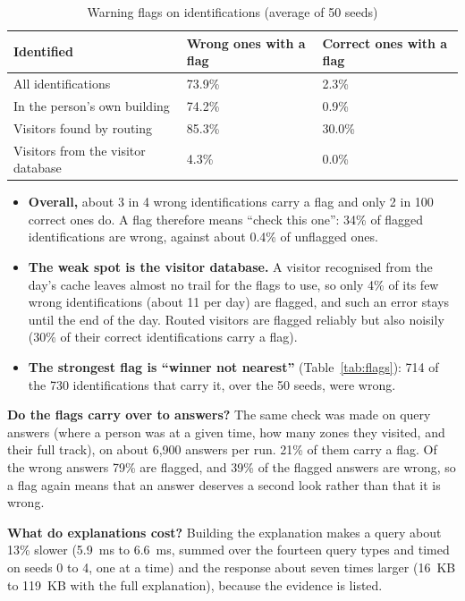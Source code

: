 \documentclass[12pt,a4paper,oneside]{report}
\begin{document}
\begin{table}[htbp]
\centering
\caption{Warning flags on identifications (average of 50 seeds)}\label{tab:expl-id}
{\small\setlength{\tabcolsep}{4pt}\renewcommand{\arraystretch}{1.2}
\begin{tabular}{|p{5.2cm}|p{4.6cm}|p{4.6cm}|}\hline
\textbf{Identified} & \textbf{Wrong ones with a flag} & \textbf{Correct ones with a flag}\\\hline
All identifications & 73.9\% & 2.3\%\\\hline
In the person's own building & 74.2\% & 0.9\%\\\hline
Visitors found by routing & 85.3\% & 30.0\%\\\hline
Visitors from the visitor database & 4.3\% & 0.0\%\\\hline
\end{tabular}}
\end{table}

\begin{itemize}
\item \textbf{Overall,} about 3 in 4 wrong identifications carry a flag and only 2 in 100 correct ones do. A flag therefore means ``check this one'': 34\% of flagged identifications are wrong, against about 0.4\% of unflagged ones.
\item \textbf{The weak spot is the visitor database.} A visitor recognised from the day's cache leaves almost no trail for the flags to use, so only 4\% of its few wrong identifications (about 11 per day) are flagged, and such an error stays until the end of the day. Routed visitors are flagged reliably but also noisily (30\% of their correct identifications carry a flag).
\item \textbf{The strongest flag is ``winner not nearest''} (Table~\ref{tab:flags}): 714 of the 730 identifications that carry it, over the 50 seeds, were wrong.
\end{itemize}

\textbf{Do the flags carry over to answers?} The same check was made on query answers (where a person was at a given time, how many zones they visited, and their full track), on about 6,900 answers per run. 21\% of them carry a flag. Of the wrong answers 79\% are flagged, and 39\% of the flagged answers are wrong, so a flag again means that an answer deserves a second look rather than that it is wrong.

\textbf{What do explanations cost?} Building the explanation makes a query about 13\% slower (5.9~ms to 6.6~ms, summed over the fourteen query types and timed on seeds 0 to 4, one at a time) and the response about seven times larger (16~KB to 119~KB with the full explanation), because the evidence is listed.
\end{document}
